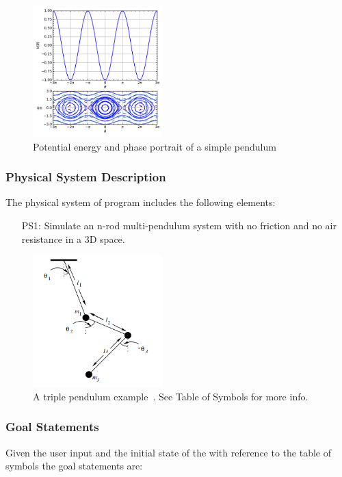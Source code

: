 \documentclass[12pt]{article}
\begin{document}
\begin{figure}[H]
	\centering
	\includegraphics[width=190px]{Pendulum_phase_PE.png}
	\caption{Potential energy and phase portrait of a simple 
	pendulum~\citep{WikipediaPendulum}}
	\label{fig:PE-pend}
\end{figure}

\subsubsection{Physical System Description}

The physical system of \progname program includes the following elements:

\begin{itemize}
\item[PS1:] Simulate an n-rod multi-pendulum system with no friction and no air
resistance in a 3D space.
\end{itemize}

\begin{figure}[H]
	\centering
	\includegraphics[width=190px]{triplependula.PNG}
\caption{A triple pendulum example~\citep{SzuminskiOlsztyn2012}.
See Table of Symbols for more info.}
	\label{fig:maxresdefault}
\end{figure}

\subsubsection{Goal Statements}

\noindent Given the user input and the initial state of the \progname with 
reference to the table of symbols the goal statements are: 
\end{document}
